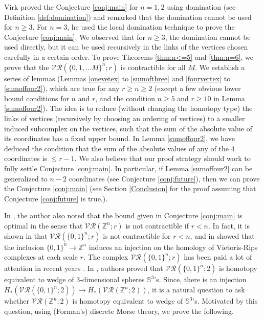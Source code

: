 \documentclass{amsart}
\theoremstyle{definition}
\theoremstyle{remark}
\numberwithin{equation}{section}
\newcommand{\Sp}{\mathbb{S}}
\newcommand{\vr}[2]{\mathcal{VR}(#1;#2)}
\def\Z{{\mathbb{Z}}}
\newcommand{\samir}[1]{\textcolor{cyan!65!black}{#1}}
\begin{document}
Virk proved the Conjecture \ref{conj:main} for $n=1, 2$ using domination (see Definition \ref{def:domination}) and remarked \cite[Remark 3.3]{Virk2025}  that the domination cannot be used for $n \geq 3$. For $n =3$, he used the local domination technique to prove the Conjecture \ref{conj:main}.  
We observed that for $n \geq 3$, the domination cannot be used directly, but it can be used recursively in the links of the vertices chosen carefully in a certain order. To prove Theorems \ref{thm:n<=5} and \ref{thm:n=6}, we prove that the $\vr{\{0, 1, \ldots M\}^n}{r}$ is contractible for all $M$. We establish a series of  lemmas (Lemmas \ref{onevetex} to \ref{sumofthree} and  \ref{fourvertex} to \ref{sumoffour2}), which are true for any  $r \geq n \geq 2$ (except a few obvious lower bound conditions for $n$ and $r$, and the condition $n \geq 5$ and $r \geq 10$ in Lemma \ref{sumoffour2}). The idea is to reduce (without changing the homotopy type) the links of vertices (recursively by choosing an ordering of vertices) to a smaller induced subcomplex on the vertices, such that the sum of the absolute value of its coordinates has a fixed upper bound.  In Lemma \ref{sumoffour2}, we have deduced the condition that the sum of the absolute values of any of the $4$ coordinates is $\leq r-1$. We also believe that our proof strategy should work to fully settle Conjecture \ref{conj:main}. In particular, if  Lemma \ref{sumoffour2} can be generalized to $n-2$ coordinates (see Conjecture \ref{conj:future}), then we can prove the Conjecture \ref{conj:main} (see Section \ref{Conclusion} for the proof assuming that Conjecture \ref{conj:future} is true.).  
 


In \cite{Virk2025}, the author also noted that the bound given in Conjecture \ref{conj:main} is optimal in the sense that $\vr{\Z^n}{r}$ is not contractible if $r < n$. In fact, it is shown in \cite{AdamsVirk2024} that $\vr{\{0, 1\}^n}{r}$ is not contractible for $r < n$, and in \cite{Virk2022Persistance} showed that the inclusion
$\{0, 1\}^n \to \Z^n$ induces an injection on the homology of Vietoris-Rips complexes
at each scale $r$.  The complex $\vr{\{0, 1\}^n}{r}$ has been paid a lot of attention in recent years \cite{Adamaszek2021,AdamsVirk2024,Martin2023,Ziqin2024,Shukla2023}. In \cite{Adamaszek2021}, authors proved that $\vr{\{0, 1\}^n}{2}$  is homotopy equivalent to wedge of 3-dimensional spheres $\Sp^3$'s. Since, there is an injection  $\tilde{H}_{\ast}(\vr{\{0, 1\}^n}{2}) \to \tilde{H}_{\ast}(\vr{\Z^n}{2})$, it is a natural question  to ask whether $ \vr{\Z^n}{2}$ is homotopy equivalent to wedge of $\Sp^3$'s. Motivated by this question, using (Forman's) discrete Morse theory, we prove the following.
\end{document}
